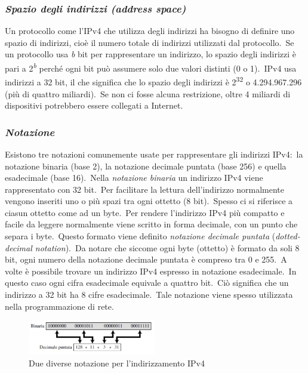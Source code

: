 \subsubsection{\emph{Spazio degli indirizzi (address space)}}

Un protocollo come l'IPv4 che utilizza degli indirizzi ha bisogno di definire uno spazio di indirizzi, cioè il numero totale di indirizzi utilizzati dal protocollo.\
Se un protocollo usa \emph{b} bit per rappresentare un indirizzo, lo spazio degli indirizzi è pari a 2\textsuperscript{\emph{b}} perché ogni bit può assumere solo due valori distinti (0 o 1).\
IPv4 usa indirizzi a 32 bit, il che significa che lo spazio degli indirizzi è 2\textsuperscript{32} o 4.294.967.296 (più di quattro miliardi).\
Se non ci fosse alcuna restrizione, oltre 4 miliardi di dispositivi potrebbero essere collegati a Internet.

\subsubsection{\emph{Notazione}}

Esistono tre notazioni comunemente usate per rappresentare gli indirizzi IPv4:\ la notazione binaria (base 2), la notazione decimale puntata (base 256) e quella esadecimale (base 16).\
Nella \emph{notazione binaria} un indirizzo IPv4 viene rappresentato con 32 bit.\
Per facilitare la lettura dell'indirizzo normalmente vengono inseriti uno o più spazi tra ogni ottetto (8 bit).\
Spesso ci si riferisce a ciasun ottetto come ad un byte.\
Per rendere l'indirizzo IPv4 più compatto e facile da leggere normalmente viene scritto in forma decimale, con un punto che separa i byte.\
Questo formato viene definito \emph{notazione decimale puntata} (\emph{dotted-decimal notation}).\
Da notare che siccome ogni byte (ottetto) è formato da soli 8 bit, ogni numero della notazione decimale puntata è compreso tra 0 e 255.\
A volte è possibile trovare un indirizzo IPv4 espresso in notazione esadecimale.\
In questo caso ogni cifra esadecimale equivale a quattro bit.\
Ciò significa che un indirizzo a 32 bit ha 8 cifre esadecimale.\
Tale notazione viene spesso utilizzata nella programmazione di rete.

\begin{figure}[H]
    \centering
    \includegraphics[width = 0.5\textwidth]{immagini/Indirizzi_IPv4.jpg}
    \caption*{Due diverse notazione per l'indirizzamento IPv4}
\end{figure}

